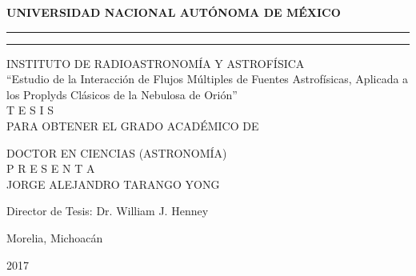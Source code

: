 \begin{center}
\large
\textbf{UNIVERSIDAD NACIONAL AUTÓNOMA DE MÉXICO}

\rule{\linewidth}{0.1pt}

\rule[3mm]{0.7\linewidth}{1pt}

INSTITUTO DE RADIOASTRONOM\'IA Y ASTROF\'ISICA
\\[3\baselineskip]
``Estudio de la Interacción de Flujos Múltiples de Fuentes Astrofísicas, Aplicada
a los Proplyds Clásicos de la Nebulosa de Orión''
\\[2\baselineskip]

T E S I S
\\[2\baselineskip]
PARA OBTENER EL GRADO ACADÉMICO DE

DOCTOR EN CIENCIAS (ASTRONOMÍA)
\\[2\baselineskip]

P R E S E N T A
\\[2\baselineskip]
JORGE ALEJANDRO TARANGO YONG

Director de Tesis: Dr. William J. Henney
\\[2\baselineskip]
\normalsize
\end{center}
\begin{flushright}
Morelia, Michoacán

2017

\end{flushright}
